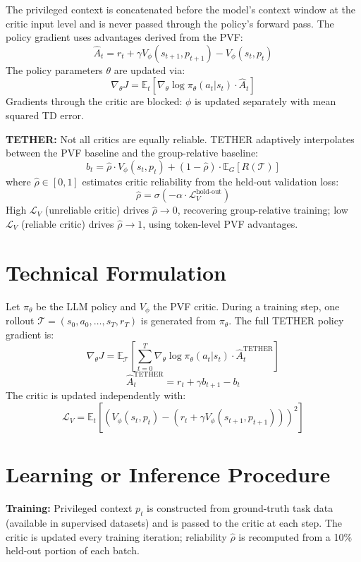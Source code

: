\documentclass[10pt,twocolumn]{article}
\begin{document}
The privileged context is concatenated before the model's context
window at the critic input level and is never passed through the
policy's forward pass. The policy gradient uses advantages derived
from the PVF:
\[
  \hat{A}_t = r_t + \gamma V_\phi(s_{t+1}, p_{t+1}) - V_\phi(s_t, p_t)
\]
The policy parameters $\theta$ are updated via:
\[
  \nabla_\theta J = \mathbb{E}_t[\nabla_\theta \log\pi_\theta(a_t|s_t) \cdot \hat{A}_t]
\]
Gradients through the critic are blocked: $\phi$ is updated
separately with mean squared TD error.

\textbf{TETHER:} Not all critics are equally reliable. TETHER
adaptively interpolates between the PVF baseline and the
group-relative baseline:
\[
  b_t = \hat{\rho} \cdot V_\phi(s_t, p_t)
      + (1-\hat{\rho}) \cdot \mathbb{E}_G[R(\mathcal{T})]
\]
where $\hat{\rho} \in [0,1]$ estimates critic reliability
from the held-out validation loss:
\[
  \hat{\rho} = \sigma(-\alpha \cdot \mathcal{L}_V^{\text{hold-out}})
\]
High $\mathcal{L}_V$ (unreliable critic) drives $\hat{\rho} \to 0$,
recovering group-relative training; low $\mathcal{L}_V$ (reliable
critic) drives $\hat{\rho} \to 1$, using token-level PVF advantages.

\section{Technical Formulation}

Let $\pi_\theta$ be the LLM policy and $V_\phi$ the PVF critic.
During a training step, one rollout $\mathcal{T} = (s_0, a_0, \ldots,
s_T, r_T)$ is generated from $\pi_\theta$. The full TETHER policy
gradient is:
\[
  \nabla_\theta J = \mathbb{E}_{\mathcal{T}}\!\left[\sum_{t=0}^T
    \nabla_\theta \log\pi_\theta(a_t|s_t)
    \cdot \hat{A}_t^{\text{TETHER}}\right]
\]
\[
  \hat{A}_t^{\text{TETHER}} = r_t + \gamma b_{t+1} - b_t
\]
The critic is updated independently with:
\[
  \mathcal{L}_V = \mathbb{E}_t\!\left[(V_\phi(s_t,p_t)
    - (r_t + \gamma V_\phi(s_{t+1},p_{t+1})))^2\right]
\]

\section{Learning or Inference Procedure}

\textbf{Training:} Privileged context $p_t$ is constructed from
ground-truth task data (available in supervised datasets) and is
passed to the critic at each step. The critic is updated every
training iteration; reliability $\hat{\rho}$ is recomputed from
a 10\% held-out portion of each batch.
\end{document}

